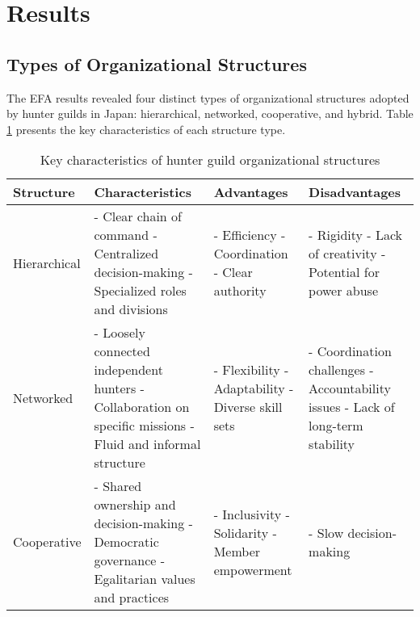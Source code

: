 \documentclass[12pt, a4paper]{article}
\begin{document}
\section{Results}
\subsection{Types of Organizational Structures}
The EFA results revealed four distinct types of organizational structures adopted by hunter guilds in Japan: hierarchical, networked, cooperative, and hybrid. Table \ref{tab:structures} presents the key characteristics of each structure type.

\begin{table}[h]
\centering
\caption{Key characteristics of hunter guild organizational structures}
\label{tab:structures}
\begin{tabular}{p{2.5cm}p{3.5cm}p{3.5cm}p{3.5cm}}
\hline
\textbf{Structure} & \textbf{Characteristics} & \textbf{Advantages} & \textbf{Disadvantages} \\
\hline
Hierarchical & 
- Clear chain of command\newline
- Centralized decision-making\newline
- Specialized roles and divisions
& 
- Efficiency\newline
- Coordination\newline
- Clear authority
&
- Rigidity\newline
- Lack of creativity\newline
- Potential for power abuse
\\
\hline
Networked & 
- Loosely connected independent hunters\newline
- Collaboration on specific missions\newline
- Fluid and informal structure
&
- Flexibility\newline
- Adaptability\newline
- Diverse skill sets
&
- Coordination challenges\newline
- Accountability issues\newline
- Lack of long-term stability
\\
\hline
Cooperative & 
- Shared ownership and decision-making\newline
- Democratic governance\newline
- Egalitarian values and practices
&
- Inclusivity\newline
- Solidarity\newline
- Member empowerment
&
- Slow decision-making\newline

\end{tabular}
\end{table}
\end{document}
